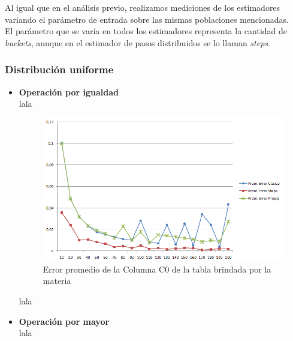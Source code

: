 \quad Al igual que en el an\'alisis previo, realizamos mediciones de los estimadores variando el par\'ametro de entrada sobre las mismas poblaciones mencionadas.\\

\quad El par\'ametro que se var\'ia en todos los estimadores representa la cantidad de \textit{buckets}, aunque en el estimador de pasos distribuidos se lo llaman \textit{steps}.

\subsubsection{Distribuci\'on uniforme}

\begin{itemize}
\item \textbf{Operaci\'on por igualdad} \\

\quad lala\\

\begin{figure}[H]
	  \begin{center}
	    \includegraphics[scale=.80]{imagenes/parametroVariableC0Eq.png}
	    \caption{Error promedio de la Columna C0 de la tabla brindada por la materia} 
	    \label{fig:C0_variando_parametro}
	  \end{center}
\end{figure}

\quad lala \\

\item \textbf{Operaci\'on por mayor} \\

\quad lala \\


\end{itemize}
